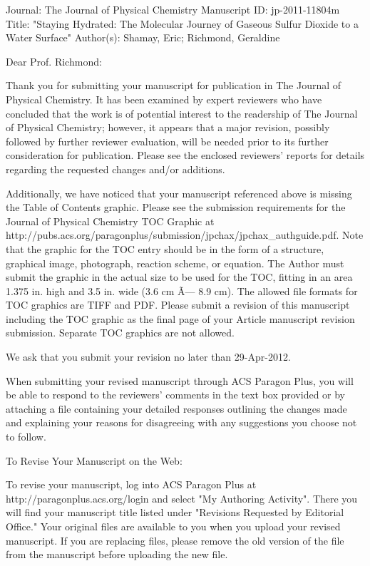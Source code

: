 

Journal: The Journal of Physical Chemistry 
Manuscript ID: jp-2011-11804m 
Title: "Staying Hydrated: The Molecular Journey of Gaseous Sulfur Dioxide to a 
Water Surface" 
Author(s): Shamay, Eric; Richmond, Geraldine 


Dear Prof. Richmond: 

Thank you for submitting your manuscript for publication in The Journal of Physical Chemistry. It has been examined by expert reviewers who have concluded that the work is of potential interest to the readership of The Journal of Physical Chemistry; however, it appears that a major revision, possibly followed by further reviewer evaluation, will be needed prior to its further consideration for publication. Please see the enclosed reviewers' reports for details regarding the requested changes and/or additions. 

Additionally, we have noticed that your manuscript referenced above is missing the Table of Contents graphic. Please see the submission requirements for the Journal of Physical Chemistry TOC Graphic at http://pubs.acs.org/paragonplus/submission/jpchax/jpchax_authguide.pdf. 
Note that the graphic for the TOC entry should be in the form of a structure, graphical image, photograph, reaction scheme, or equation. The Author must submit the graphic in the actual size to be used for the TOC, fitting in an area 1.375 in. high and 3.5 in. wide (3.6 cm Ã— 8.9 cm). The allowed file formats for TOC graphics are TIFF and PDF. Please submit a revision of this manuscript including the TOC graphic as the final page of your Article manuscript revision submission. Separate TOC graphics are not allowed. 

We ask that you submit your revision no later than 29-Apr-2012. 

When submitting your revised manuscript through ACS Paragon Plus, you will be able to respond to the reviewers' comments in the text box provided or by attaching a file containing your detailed responses outlining the changes made and explaining your reasons for disagreeing with any suggestions you choose not to follow. 

To Revise Your Manuscript on the Web: 

To revise your manuscript, log into ACS Paragon Plus at http://paragonplus.acs.org/login and select "My Authoring Activity". There you will find your manuscript title listed under "Revisions Requested by Editorial Office." Your original files are available to you when you upload your revised manuscript. If you are replacing files, please remove the old version of the file from the manuscript before uploading the new file. 


